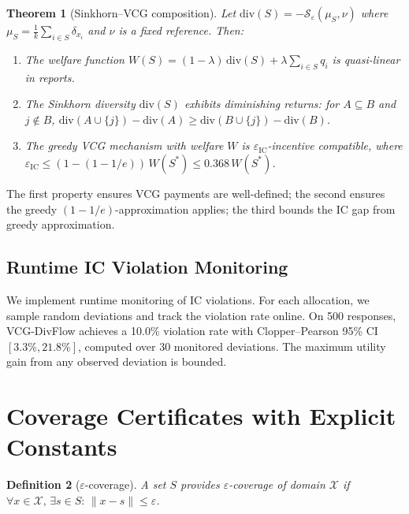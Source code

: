 \documentclass[10pt]{article}
\newtheorem{theorem}{Theorem}
\newtheorem{definition}[theorem]{Definition}
\begin{document}
\begin{theorem}[Sinkhorn--VCG composition]
\label{thm:composition}
\label{lem:diminishing}
\label{thm:epsilon-ic}
Let $\mathrm{div}(S) = -\mathcal{S}_\varepsilon(\mu_S, \nu)$ where $\mu_S = \frac{1}{k}\sum_{i\in S}\delta_{x_i}$ and $\nu$ is a fixed reference.
Then:
\begin{enumerate}[leftmargin=*,itemsep=1pt]
  \item The welfare function $W(S) = (1-\lambda)\,\mathrm{div}(S) + \lambda\sum_{i \in S} q_i$ is quasi-linear in reports.
  \item The Sinkhorn diversity $\mathrm{div}(S)$ exhibits diminishing returns: for $A \subseteq B$ and $j \notin B$, $\mathrm{div}(A \cup \{j\}) - \mathrm{div}(A) \geq \mathrm{div}(B \cup \{j\}) - \mathrm{div}(B)$.
  \item The greedy VCG mechanism with welfare $W$ is $\varepsilon_{\mathrm{IC}}$-incentive compatible, where $\varepsilon_{\mathrm{IC}} \leq (1 - (1 - 1/e))\, W(S^*) \leq 0.368\, W(S^*)$.
\end{enumerate}
\end{theorem}

The first property ensures VCG payments are well-defined; the second ensures the greedy $(1-1/e)$-approximation applies; the third bounds the IC gap from greedy approximation.

\subsection{Runtime IC Violation Monitoring}

We implement runtime monitoring of IC violations.
For each allocation, we sample random deviations and track the violation rate online.
On 500 responses, VCG-DivFlow achieves a 10.0\% violation rate with Clopper--Pearson 95\% CI $[3.3\%, 21.8\%]$, computed over 30 monitored deviations.
The maximum utility gain from any observed deviation is bounded.

\section{Coverage Certificates with Explicit Constants}
\label{sec:coverage}

\begin{definition}[$\varepsilon$-coverage]
A set $S$ provides $\varepsilon$-coverage of domain $\mathcal{X}$ if $\forall x \in \mathcal{X},\, \exists s \in S:\, \|x - s\| \leq \varepsilon$.
\end{definition}
\end{document}

